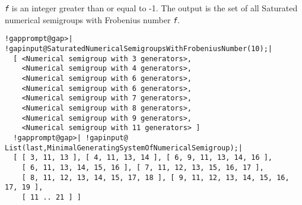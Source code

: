 \documentclass[a4paper,11pt]{report}
\begin{document}
{{{ \mbox{\texttt{\mdseries\slshape f}} is an integer greater than or equal to -1. The output is the set of all
Saturated numerical semigroups with Frobenius number \mbox{\texttt{\mdseries\slshape f}}. 
\begin{Verbatim}[commandchars=!@|,fontsize=\small,frame=single,label=Example]
  !gapprompt@gap>| !gapinput@SaturatedNumericalSemigroupsWithFrobeniusNumber(10);|
  [ <Numerical semigroup with 3 generators>, 
    <Numerical semigroup with 4 generators>, 
    <Numerical semigroup with 6 generators>, 
    <Numerical semigroup with 6 generators>, 
    <Numerical semigroup with 7 generators>, 
    <Numerical semigroup with 8 generators>, 
    <Numerical semigroup with 9 generators>, 
    <Numerical semigroup with 11 generators> ]
  !gapprompt@gap>| !gapinput@ List(last,MinimalGeneratingSystemOfNumericalSemigroup);|
  [ [ 3, 11, 13 ], [ 4, 11, 13, 14 ], [ 6, 9, 11, 13, 14, 16 ], 
    [ 6, 11, 13, 14, 15, 16 ], [ 7, 11, 12, 13, 15, 16, 17 ], 
    [ 8, 11, 12, 13, 14, 15, 17, 18 ], [ 9, 11, 12, 13, 14, 15, 16, 17, 19 ], 
    [ 11 .. 21 ] ]
\end{Verbatim}
 }

 }

 }

 
\end{document}
